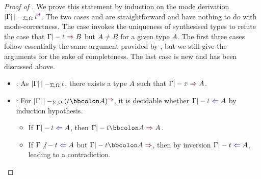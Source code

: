 \begin{proof}[Proof of {}]
  We prove this statement by induction on the mode derivation\/ $\erase{\Gamma} |-_{\Sigma, \Omega} \isTerm{t}^{\dir{d}}$.
  The two cases  and  are straightforward and have nothing to do with mode-correctness.
  The case  invokes the uniqueness of synthesised types to refute the case that $\Gamma |- \isTerm{t} \syn B$ but $A \neq B$ for a given type $A$.
  The first three cases follow essentially the same argument provided by \citet{Wadler2022}, but we still give the arguments for the sake of completeness.
  The last case  is new and has been discussed above.
  \begin{itemize}
    \item {}: As $\erase{\Gamma} |-_{\Sigma, \Omega} \isTerm{t}$, there exists a type $A$ such that $\Gamma |- \isTerm{x} \syn A$.

    \item {}: For $\erase{\Gamma} |-_{\Sigma, \Omega} (\isTerm{t} \annotate A)^{\syn}$, it is decidable whether $\Gamma |- \isTerm{t} \chk A$ by induction hypothesis.
      \begin{itemize}
        \item If $\Gamma |- \isTerm{t} \chk A$, then $\Gamma |- \isTerm{t \annotate A} \syn A$.
        \item If $\Gamma \not|- t \chk A$ but $\Gamma |- \isTerm{t \annotate A} \syn$, then by inversion $\Gamma |- t \chk A$, leading to a contradiction.
      \end{itemize}
      

\end{itemize}
\end{proof}

